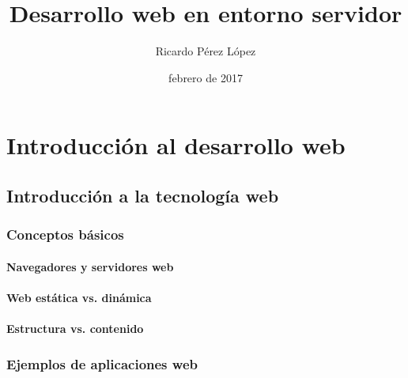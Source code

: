 \documentclass[a4paper,11pt,spanish]{sphinxmanual}
\title{Desarrollo web en entorno servidor}
\date{febrero de 2017}
\author{Ricardo Pérez López}
\begin{document}
\maketitle
\sphinxtableofcontents
{}\label{\detokenize{index::doc}}



\part{Introducción al desarrollo web}
\label{\detokenize{introduccion-al-desarrollo-web:desarrollo-web-en-entorno-servidor}}\label{\detokenize{introduccion-al-desarrollo-web::doc}}\label{\detokenize{introduccion-al-desarrollo-web:introduccion-al-desarrollo-web}}

\chapter{Introducción a la tecnología web}
\label{\detokenize{introduccion-al-desarrollo-web:introduccion-a-la-tecnologia-web}}

\section{Conceptos básicos}
\label{\detokenize{introduccion-al-desarrollo-web:conceptos-basicos}}

\subsection{Navegadores y servidores web}
\label{\detokenize{introduccion-al-desarrollo-web:navegadores-y-servidores-web}}

\subsection{Web estática vs. dinámica}
\label{\detokenize{introduccion-al-desarrollo-web:web-estatica-vs-dinamica}}

\subsection{Estructura vs. contenido}
\label{\detokenize{introduccion-al-desarrollo-web:estructura-vs-contenido}}

\section{Ejemplos de aplicaciones web}
\label{\detokenize{introduccion-al-desarrollo-web:ejemplos-de-aplicaciones-web}}
\end{document}
